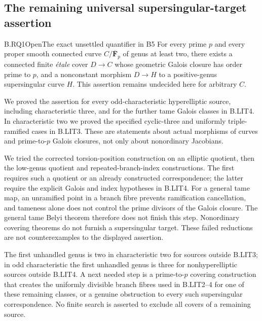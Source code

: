 \subsection{The remaining universal supersingular-target assertion}

\begin{claim}{B.RQ1}{Open}{The exact unsettled quantifier in B5}
For every prime $p$ and every proper smooth connected curve
$C/\overline{\mathbf F}_p$ of genus at least two, there exists
a connected finite \emph{\'etale} cover $D\to C$ whose geometric
Galois closure has order prime to $p$, and a nonconstant morphism
$D\to H$ to a positive-genus supersingular curve $H$.
This assertion remains undecided here for arbitrary $C$.
\end{claim}

We proved the assertion for every odd-characteristic hyperelliptic
source, including characteristic three, and for the further tame
Galois classes in B.LIT4. In characteristic two we proved the
specified cyclic-three and uniformly triple-ramified cases in
B.LIT3. These are statements about actual morphisms of curves and
prime-to-$p$ Galois closures, not only about nonordinary Jacobians.

We tried the corrected torsion-position construction on an elliptic
quotient, then the low-genus quotient and repeated-branch-index
constructions. The first requires such a quotient or an already
constructed correspondence; the latter require the explicit
Galois and index hypotheses in B.LIT4. For a general tame map,
an unramified point in a branch fibre prevents ramification
cancellation, and tameness alone does not control the prime
divisors of the Galois closure. The general tame Belyi theorem
therefore does not finish this step. Nonordinary covering theorems
do not furnish a supersingular target. These failed reductions
are not counterexamples to the displayed assertion.

The first unhandled genus is two in characteristic two for sources
outside B.LIT3; in odd characteristic the first unhandled genus is
three for nonhyperelliptic sources outside B.LIT4. A next needed
step is a prime-to-$p$ covering construction that creates the
uniformly divisible branch fibres used in B.LIT2--4 for one of
these remaining classes, or a genuine obstruction to every such
supersingular correspondence. No finite search is asserted to
exclude all covers of a remaining source.
